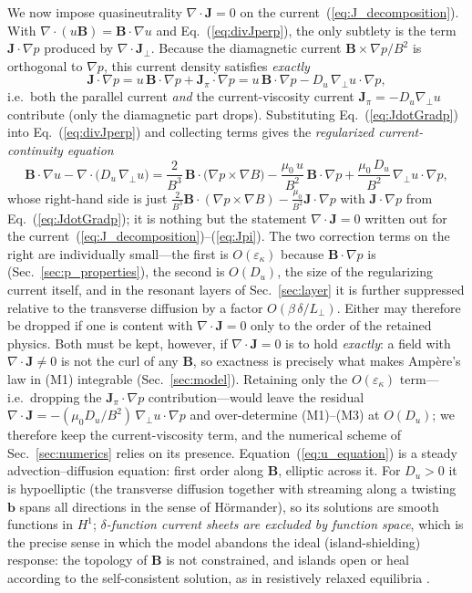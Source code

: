 \documentclass[english]{article}
\newcommand{\bB}{\mathbf{B}}
\newcommand{\bJ}{\mathbf{J}}
\newcommand{\bb}{\mathbf{b}}
\newcommand{\gradperp}{\nabla_{\!\perp}}
\begin{document}
We now impose quasineutrality $\nabla\cdot\bJ=0$ on the current~(\ref{eq:J_decomposition}). With
$\nabla\cdot(u\bB)=\bB\cdot\nabla u$ and Eq.~(\ref{eq:divJperp}), the only subtlety is the term
$\bJ\cdot\nabla p$ produced by $\nabla\cdot\bJ_\perp$. Because the diamagnetic current
$\bB\times\nabla p/B^{2}$ is orthogonal to $\nabla p$, this current density satisfies \emph{exactly}
\begin{equation}
\bJ\cdot\nabla p=u\,\bB\cdot\nabla p+\bJ_\pi\cdot\nabla p
=u\,\bB\cdot\nabla p-D_u\,\gradperp u\cdot\nabla p ,
\label{eq:JdotGradp}
\end{equation}
i.e.\ both the parallel current \emph{and} the current-viscosity current $\bJ_\pi=-D_u\gradperp u$
contribute (only the diamagnetic part drops). Substituting Eq.~(\ref{eq:JdotGradp}) into
Eq.~(\ref{eq:divJperp}) and collecting terms gives the \emph{regularized current-continuity
equation}
\begin{equation}
\boxed{\;
\bB\cdot\nabla u-\nabla\cdot\big(D_u\,\gradperp u\big)
=\frac{2}{B^{3}}\,\bB\cdot\big(\nabla p\times\nabla B\big)
-\frac{\mu_0\,u}{B^{2}}\,\bB\cdot\nabla p
+\frac{\mu_0\,D_u}{B^{2}}\,\gradperp u\cdot\nabla p ,
\;}
\label{eq:u_equation}
\end{equation}
whose right-hand side is just
$\tfrac{2}{B^{3}}\bB\cdot(\nabla p\times\nabla B)-\tfrac{\mu_0}{B^{2}}\bJ\cdot\nabla p$ with
$\bJ\cdot\nabla p$ from Eq.~(\ref{eq:JdotGradp}); it is nothing but the statement $\nabla\cdot\bJ=0$
written out for the current~(\ref{eq:J_decomposition})--(\ref{eq:Jpi}). The two correction terms on
the right are individually small---the first is $O(\varepsilon_\kappa)$ because $\bB\cdot\nabla p$ is
(Sec.~\ref{sec:p_properties}), the second is $O(D_u)$, the size of the regularizing current itself,
and in the resonant layers of Sec.~\ref{sec:layer} it is further suppressed relative to the
transverse diffusion by a factor $O(\beta\,\delta/L_\perp)$. Either may therefore be dropped if one
is content with $\nabla\cdot\bJ=0$ only to the order of the retained physics. Both must be kept,
however, if $\nabla\cdot\bJ=0$ is to hold \emph{exactly}: a field with $\nabla\cdot\bJ\ne0$ is not
the curl of any $\bB$, so exactness is precisely what makes Amp\`ere's law in (M1) integrable
(Sec.~\ref{sec:model}). Retaining only the $O(\varepsilon_\kappa)$ term---i.e.\ dropping the
$\bJ_\pi\cdot\nabla p$ contribution---would leave the residual
$\nabla\cdot\bJ=-(\mu_0 D_u/B^{2})\,\gradperp u\cdot\nabla p$ and over-determine (M1)--(M3) at
$O(D_u)$; we therefore keep the current-viscosity term, and the numerical scheme of
Sec.~\ref{sec:numerics} relies on its presence. Equation~(\ref{eq:u_equation}) is a steady
advection--diffusion equation: first order along $\bB$, elliptic across it. For $D_u>0$ it is
hypoelliptic (the transverse diffusion together with streaming along a twisting $\bb$ spans all
directions in the sense of H\"ormander), so its solutions are smooth functions in $H^{1}$;
\emph{$\delta$-function current sheets are excluded by function space}, which is the precise sense
in which the model abandons the ideal (island-shielding) response: the topology of $\bB$ is not
constrained, and islands open or heal according to the self-consistent solution, as in resistively
relaxed equilibria \cite{reiman1986,harafuji1989,krommes2009}.
\end{document}
